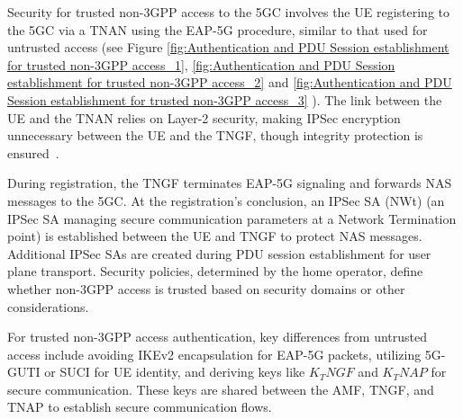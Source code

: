 Security for trusted non-\ac{3GPP} access to the \ac{5GC} involves the \ac{UE} registering to the \ac{5GC} via a \ac{TNAN} using the \ac{EAP-5G} procedure, similar to that used for untrusted access (see Figure \ref{fig:Authentication and PDU Session establishment for trusted non-3GPP access_1}, \ref{fig:Authentication and PDU Session establishment for trusted non-3GPP access_2} and \ref{fig:Authentication and PDU Session establishment for trusted non-3GPP access_3} ). The link between the \ac{UE} and the \ac{TNAN} relies on Layer-2 security, making \ac{IPSec} encryption unnecessary between the \ac{UE} and the \ac{TNGF}, though integrity protection is ensured~\cite{33.501-p132}.

During registration, the \ac{TNGF} terminates \ac{EAP-5G} signaling and forwards \ac{NAS} messages to the \ac{5GC}. At the registration's conclusion, an \ac{IPSec SA (NWt)} (an \acl{IPSec SA} managing secure communication parameters at a Network Termination point) is established between the \ac{UE} and \ac{TNGF} to protect \ac{NAS} messages. Additional \acp{IPSec SA} are created during \ac{PDU} session establishment for user plane transport. Security policies, determined by the home operator, define whether non-\ac{3GPP} access is trusted based on security domains or other considerations.

For trusted non-\ac{3GPP} access authentication, key differences from untrusted access include avoiding \ac{IKEv2} encapsulation for \ac{EAP-5G} packets, utilizing \ac{5G-GUTI} or \ac{SUCI} for \ac{UE} identity, and deriving keys like $K_TNGF$ and $K_TNAP$ for secure communication. These keys are shared between the \ac{AMF}, \ac{TNGF}, and \ac{TNAP} to establish secure communication flows.

